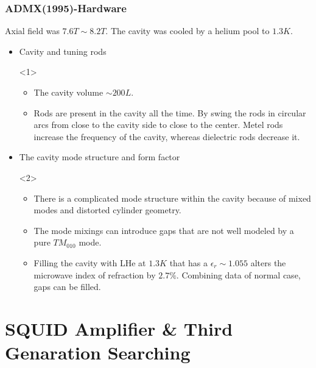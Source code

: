 \documentclass{beamer}
\begin{document}
\begin{frame}
  \frametitle{ADMX(1995)-Hardware}
  Axial field was $7.6T \sim 8.2T$. The cavity was cooled by a helium pool to
  $1.3K$.
  \begin{itemize}
  \item Cavity and tuning rods
    \begin{onlyenv}<1>
      \begin{itemize}
      \item The cavity volume $\sim 200 L$.
      \item Rods are present in the cavity all the time. By swing the rods in
        circular arcs from close to the cavity side to close to the
        center. Metel rods increase the frequency of the cavity, whereas
        dielectric rods decrease it.
      \end{itemize}
    \end{onlyenv}
  \item The cavity mode structure and form factor
    \begin{onlyenv}<2>
      \begin{itemize}
      \item There is a complicated mode structure within the cavity
        because of mixed modes and distorted cylinder geometry.
      \item The mode mixings can introduce gaps that are not well
        modeled by a pure $TM_{010}$ mode.
      \item Filling the cavity with LHe at $1.3K$ that has a
        $\epsilon_r \sim 1.055$ alters the microwave index of
        refraction by $2.7\%$. Combining data of normal case, gaps
        can be filled.
      \end{itemize}
    \end{onlyenv}
  \end{itemize}
\end{frame}

\section{SQUID Amplifier \& Third Genaration Searching}

\end{document}
